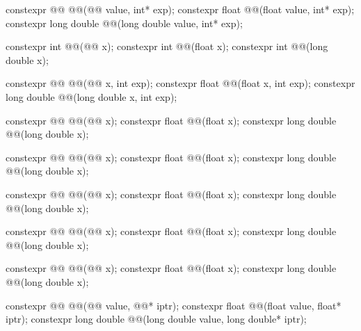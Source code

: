 \begin{codeblock}
{  constexpr @@ @@(@@ value, int* exp);
  constexpr float               @@(float value, int* exp);
  constexpr long double         @@(long double value, int* exp);

  constexpr int @@(@@ x);
  constexpr int @@(float x);
  constexpr int @@(long double x);

  constexpr @@ @@(@@ x, int exp);
  constexpr float               @@(float x, int exp);
  constexpr long double         @@(long double x, int exp);

  constexpr @@ @@(@@ x);
  constexpr float               @@(float x);
  constexpr long double         @@(long double x);

  constexpr @@ @@(@@ x);
  constexpr float               @@(float x);
  constexpr long double         @@(long double x);

  constexpr @@ @@(@@ x);
  constexpr float               @@(float x);
  constexpr long double         @@(long double x);

  constexpr @@ @@(@@ x);
  constexpr float               @@(float x);
  constexpr long double         @@(long double x);

  constexpr @@ @@(@@ x);
  constexpr float               @@(float x);
  constexpr long double         @@(long double x);

  constexpr @@ @@(@@ value, @@* iptr);
  constexpr float               @@(float value, float* iptr);
  constexpr long double         @@(long double value, long double* iptr);

}
\end{codeblock}
